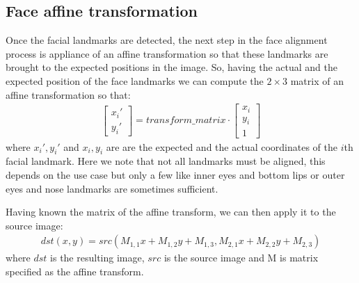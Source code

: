 \subsection{Face affine transformation}
Once the facial landmarks are detected, the next step in the face alignment process is appliance of an affine transformation so that these landmarks are brought to the expected positions in the image. So, having the actual and the expected position of the face landmarks we can compute the $2\times3$ matrix of an affine transformation so that:
\begin{align}
	\begin{bmatrix}
	x_{i}'\\
	y_{i}'
	\end{bmatrix}
	=
	transform\_matrix \cdot
	\begin{bmatrix}
	x_{i}\\
	y_{i}\\
	1
	\end{bmatrix}
\end{align}
where $x_{i}', y_{i}'$ and $x_{i}, y_{i}$ are are the expected and the actual coordinates of the $i$th facial landmark. Here we note that not all landmarks must be aligned, this depends on the use case but only a few like inner eyes and bottom lips or outer eyes and nose landmarks are sometimes sufficient.

Having known the matrix of the affine transform, we can then apply it to the source image:
\begin{align}
	dst(x, y) = src(M_{1,1}x + M_{1,2}y + M_{1,3}, M_{2,1}x + M_{2,2}y + M_{2,3})
\end{align} where $dst$ is the resulting image, $src$ is the source image and M is matrix specified as the affine transform. 
